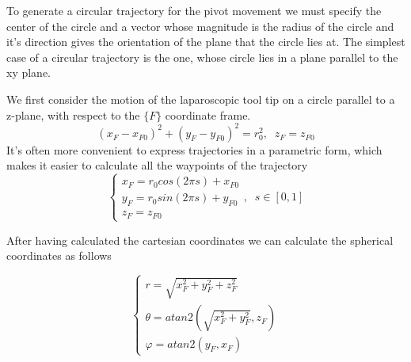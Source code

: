 To generate a circular trajectory for the pivot movement we must specify the center of the circle 
and a vector whose magnitude is the radius of the circle and it’s direction gives the orientation 
of the plane that the circle lies at. The simplest case of a circular trajectory is the one, 
whose circle lies in a plane parallel to the xy plane.


We first consider the motion of the laparoscopic tool tip on a circle parallel to a z-plane, with respect to the $\lbrace F \rbrace$ coordinate frame.
\begin{equation}
(x^{}_{F} - x^{}_{F0})^2 + (y^{}_{F} - y^{}_{F0})^2 = r_0^2, \;\; z^{}_{F} = z^{}_{F0}
\end{equation}
It's often more convenient to express trajectories in a parametric form, which makes it easier to calculate all the waypoints of the trajectory
\begin{equation}
\label{circle-z-plane-traj}
\begin{cases}
x^{}_{F} = r_0cos(2πs) + x^{}_{F0} \\
y^{}_{F} = r_0sin(2πs) + y^{}_{F0} \\
z^{}_{F} = z^{}_{F0}
\end{cases} ,
\;\;
s \in [0, 1]
\end{equation}

After having calculated the cartesian coordinates we can calculate the spherical coordinates as follows

\begin{equation}
\label{eqns:cartesian-to-spherical}
\begin{cases}
r = \sqrt{x^{2}_{F} + y^{2}_{F} + z^{2}_{F}} \\
θ = atan2 \left( \sqrt{x^{2}_{F} + y^{2}_{F}}, z^{}_{F} \right) \\
φ = atan2(y^{}_{F}, x^{}_{F})
\end{cases}
\end{equation}

